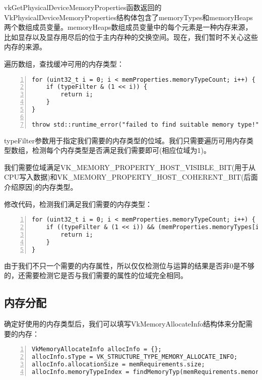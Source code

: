 \documentclass{ctexart}
\begin{document}
vkGetPhysicalDeviceMemoryProperties函数返回的VkPhysicalDeviceMemoryProperties结构体包含了memoryTypes和memoryHeaps两个数组成员变量。memoryHeaps数组成员变量中的每个元素是一种内存来源，比如显存以及显存用尽后的位于主内存种的交换空间。现在，我们暂时不关心这些内存的来源。

遍历数组，查找缓冲可用的内存类型：

\begin{lstlisting}[language={[ANSI]C},keywordstyle=\color{blue!70},commentstyle=\color{red!50!green!50!blue!50},frame=shadowbox, rulesepcolor=\color{red!20!green!20!blue!20},basicstyle=\small,numbers=left, numberstyle=\tiny,breaklines=true]
for (uint32_t i = 0; i < memProperties.memoryTypeCount; i++) {
	if (typeFilter & (1 << i)) {
		return i;
	}
}

throw std::runtime_error("failed to find suitable memory type!");
\end{lstlisting}

typeFilter参数用于指定我们需要的内存类型的位域。我们只需要遍历可用内存类型数组，检测每个内存类型是否满足我们需要即可(相应位域为1)。

我们需要位域满足VK\_MEMORY\_PROPERTY\_HOST\_VISIBLE\_BIT(用于从CPU写入数据)和VK\_MEMORY\_PROPERTY\_HOST\_COHERENT\_BIT(后面介绍原因)的内存类型。

修改代码，检测我们满足我们需要的内存类型：

\begin{lstlisting}[language={[ANSI]C},keywordstyle=\color{blue!70},commentstyle=\color{red!50!green!50!blue!50},frame=shadowbox, rulesepcolor=\color{red!20!green!20!blue!20},basicstyle=\small,numbers=left, numberstyle=\tiny,breaklines=true]
for (uint32_t i = 0; i < memProperties.memoryTypeCount; i++) {
	if ((typeFilter & (1 << i)) && (memProperties.memoryTypes[i].propertyFlags & properties) == properties) {
		return i;
	}
}
\end{lstlisting}

由于我们不只一个需要的内存属性，所以仅仅检测位与运算的结果是否非0是不够的，还需要检测它是否与我们需要的属性的位域完全相同。

\subsection{内存分配}

确定好使用的内存类型后，我们可以填写VkMemoryAllocateInfo结构体来分配需要的内存：

\begin{lstlisting}[language={[ANSI]C},keywordstyle=\color{blue!70},commentstyle=\color{red!50!green!50!blue!50},frame=shadowbox, rulesepcolor=\color{red!20!green!20!blue!20},basicstyle=\small,numbers=left, numberstyle=\tiny,breaklines=true]
VkMemoryAllocateInfo allocInfo = {};
allocInfo.sType = VK_STRUCTURE_TYPE_MEMORY_ALLOCATE_INFO;
allocInfo.allocationSize = memRequirements.size;
allocInfo.memoryTypeIndex = findMemoryTyp(memRequirements.memoryTypeBits, VK_MEMORY_PROPERTY_HOST_VISIBLE_BIT | VK_MEMORY_PROPERTY_HOST_COHERENT_BIT);
\end{lstlisting}
\end{document}

